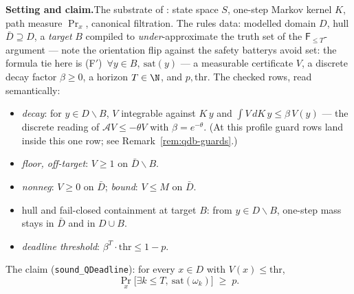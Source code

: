 

\textbf{Setting and claim.}\enspace The substrate of
: state space $S$, one-step Markov kernel $K$,
path measure $\Pr_x$, canonical filtration. The rule\textquotesingle s
data: modelled domain $D$, hull $\bar{D} \supseteq D$, a \emph{target}
$B$ compiled to \emph{under}-approximate the truth set of the
$\mathsf{F}_{\le T}$-argument --- note the orientation flip against the
safety battery\textquotesingle s avoid set: the formula tie here is
(F$'$)\ $\forall y \in B,\ \mathrm{sat}(y)$ --- a measurable certificate
$V$, a discrete decay factor $\beta \ge 0$, a horizon $T \in \N$, and
$p, \mathrm{thr}$. The checked rows, read semantically:
\begin{itemize}
\item[(D1)] \emph{decay}: for $y \in D \smallsetminus B$, $V$ integrable
  against $K\,y$ and $\int V \,dK\,y \le \beta\, V(y)$ --- the discrete
  reading of $\mathcal{A} V \le -\theta V$ with $\beta = e^{-\theta}$.
  (At this profile guard rows land inside this one row; see
  Remark~\ref{rem:qdb-guards}.)
\item[(D2)] \emph{floor, off-target}: $V \ge 1$ on
  $\bar{D} \smallsetminus B$.
\item[(D3)] \emph{nonneg}: $V \ge 0$ on $\bar{D}$; \emph{bound}:
  $V \le M$ on $\bar{D}$.
\item[(R3)/(R4)] hull and fail-closed containment at target $B$: from
  $y \in D \smallsetminus B$, one-step mass stays in $\bar{D}$ and in
  $D \cup B$.
\item[($\Theta_{\mathsf F}$)] \emph{deadline threshold}:
  $\beta^{T} \cdot \mathrm{thr} \le 1 - p$.
\end{itemize}
The claim (\texttt{sound\_QDeadline}): for every $x \in D$ with
$V(x) \le \mathrm{thr}$,
\[
\Pr_x\bigl[\exists k \le T,\ \mathrm{sat}(\omega_k)\bigr] \;\ge\; p .
\]

